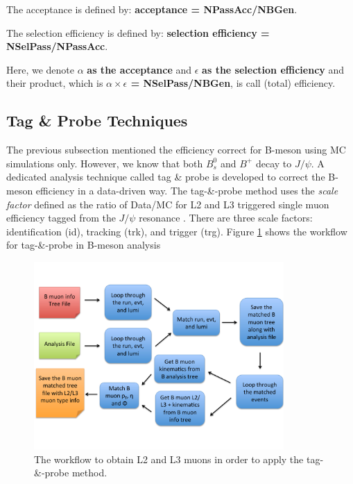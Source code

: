 The acceptance is defined by: \textbf{acceptance = NPassAcc/NBGen}.

The selection efficiency is defined by: \textbf{selection efficiency = NSelPass/NPassAcc}.

Here, we denote $\alpha$ \textbf{as the acceptance} and $\epsilon$ \textbf{as the selection efficiency} and their product, which is \textbf{$\alpha \times \epsilon$ = NSelPass/NBGen}, is call (total) efficiency. 

\subsection{Tag \& Probe Techniques}

The previous subsection mentioned the efficiency correct for B-meson using MC simulations only. However, we know that both $B^0_s$ and $B^+$ decay to $J/\psi$. A dedicated analysis technique called tag \& probe is developed to correct the B-meson efficiency in a data-driven way. The tag-\&-probe method uses the \textit{scale factor} defined as the ratio of Data/MC for L2 and L3 triggered single muon efficiency tagged from the $J/\psi$ resonance \cite{TnPMethod}. There are three scale factors: identification (id), tracking (trk), and trigger (trg). Figure \ref{L2L3MuonWF} shows the workflow for tag-\&-probe in B-meson analysis


\begin{figure}[h]
\begin{center}
\includegraphics[width= 0.85\textwidth]{Figures/Chapter5/L2L3MuonWF.pdf}
\caption{The workflow to obtain L2 and L3 muons in order to apply the tag-\&-probe method.}
\label{L2L3MuonWF}
\end{center}
\end{figure}

